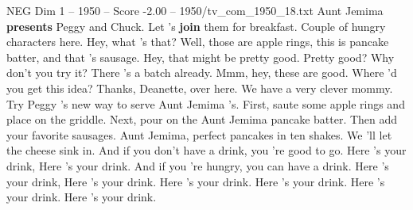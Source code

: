 \begin{textsample}{NEG Dim 1 – 1950 – Score -2.00 – 1950/tv\_com\_1950\_18.txt}  \label{ex:f1_neg_081}
Aunt Jemima \textbf{presents} Peggy and Chuck.
Let 's \textbf{join} them for breakfast.
Couple of hungry characters here.
Hey, what 's that?
Well, those are apple rings, this is pancake batter, and that 's sausage.
Hey, that might be pretty good.
Pretty good?
Why don't you try it?
There 's a batch already.
Mmm, hey, these are good.
Where 'd you get this idea?
Thanks, Deanette, over here.
We have a very clever mommy.
Try Peggy 's new way to serve Aunt Jemima 's.
First, saute some apple rings and place on the griddle.
Next, pour on the Aunt Jemima pancake batter.
Then add your favorite sausages.
Aunt Jemima, perfect pancakes in ten shakes.
We 'll let the cheese sink in.
And if you don't have a drink, you 're good to go.
Here 's your drink, Here 's your drink.
And if you 're hungry, you can have a drink.
Here 's your drink, Here 's your drink.
Here 's your drink.
Here 's your drink.
Here 's your drink.
Here 's your drink.

\end{textsample}
